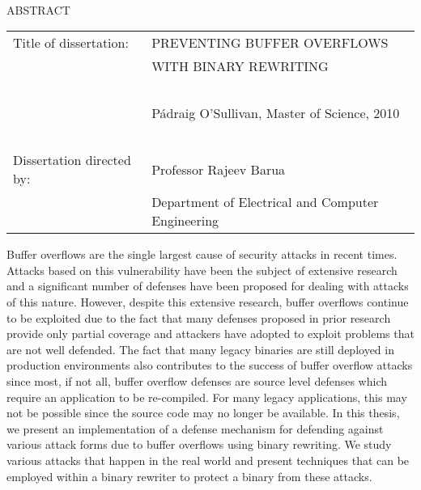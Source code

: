 
\hbox{\ }

\renewcommand{\baselinestretch}{1}
\small \normalsize

\begin{center}
\large{{ABSTRACT}} 

\vspace{3em} 

\end{center}
\hspace{-.15in}
\begin{tabular}{ll}
Title of dissertation:    & {\large  PREVENTING BUFFER OVERFLOWS}\\
&				      {\large  WITH BINARY REWRITING} \\
\ \\
&                          {\large  P\'{a}draig O'Sullivan, Master of Science, 2010} \\
\ \\
Dissertation directed by: & {\large  Professor Rajeev Barua} \\
&  				{\large	 Department of Electrical and Computer Engineering} \\
\end{tabular}

\vspace{3em}

\renewcommand{\baselinestretch}{2}
\large \normalsize

Buffer overflows are the single largest cause of security attacks in recent times. Attacks based on
this vulnerability have been the subject of extensive research and a significant number of defenses
have been proposed for dealing with attacks of this nature. However, despite this extensive
research, buffer overflows continue to be exploited due to the fact that many defenses proposed in
prior research provide only partial coverage and attackers have adopted to exploit problems that are
not well defended. The fact that many legacy binaries are still deployed in production environments
also contributes to the success of buffer overflow attacks since most, if not all, buffer overflow
defenses are source level defenses which require an application to be re-compiled. For many legacy
applications, this may not be possible since the source code may no longer be available. In this
thesis, we present an implementation of a defense mechanism for defending against various attack
forms due to buffer overflows using binary rewriting. We study various attacks that happen in the
real world and present techniques that can be employed within a binary rewriter to protect a binary
from these attacks.

